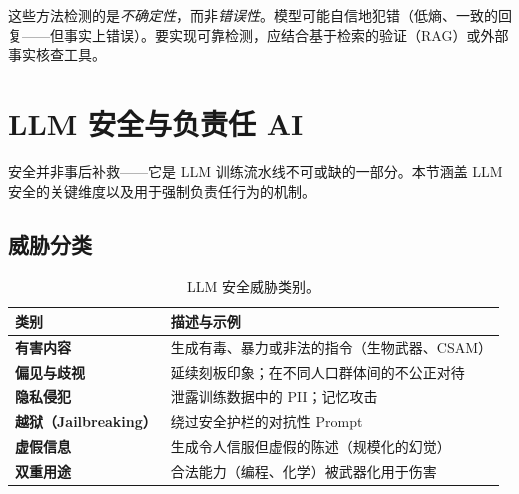\begin{warningbox}[模型层级检测的局限]
这些方法检测的是\emph{不确定性}，而非\emph{错误性}。模型可能自信地犯错（低熵、一致的回复——但事实上错误）。要实现可靠检测，应结合基于检索的验证（RAG）或外部事实核查工具。
\end{warningbox}

\section{LLM 安全与负责任 AI}
\label{sec:safety}

安全并非事后补救——它是 LLM 训练流水线不可或缺的一部分。本节涵盖 LLM 安全的关键维度以及用于强制负责任行为的机制。

\subsection{威胁分类}
\label{threat-taxonomy}

\begin{table}[ht!]
\centering\small
\caption{LLM 安全威胁类别。}
\begin{tabularx}{0.92\linewidth}{@{}l Z{1}@{}}
\toprule
\textbf{类别} & \textbf{描述与示例} \\
\midrule
\textbf{有害内容} & 生成有毒、暴力或非法的指令（生物武器、CSAM） \\
\textbf{偏见与歧视} & 延续刻板印象；在不同人口群体间的不公正对待~\cite{gallegos2024bias} \\
\textbf{隐私侵犯} & 泄露训练数据中的 PII；记忆攻击~\cite{carlini2021extracting} \\
\textbf{越狱（Jailbreaking）} & 绕过安全护栏的对抗性 Prompt~\cite{zou2023universal} \\
\textbf{虚假信息} & 生成令人信服但虚假的陈述（规模化的幻觉） \\
\textbf{双重用途} & 合法能力（编程、化学）被武器化用于伤害 \\
\bottomrule
\end{tabularx}
\end{table}


